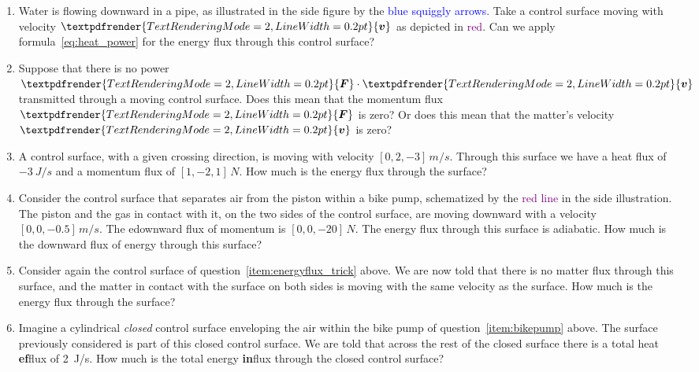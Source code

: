 \documentclass[a4paper,12pt,%
onecolumn,oneside,%
british%
]{memoir}
\renewcommand*{\bm}[1]{\textpdfrender{TextRenderingMode=2,LineWidth=0.2pt}{\boldsymbol{#1}}}
\renewcommand*{\|}[1][]{\nonscript\:#1\vert\nonscript\:\mathopen{}}
\newcommand*{\yv}{\bm{v}}
\newcommand*{\yF}{\bm{F}}
\begin{document}
\begin{exercise}
  \begin{enumerate}[exerc]
  \item Water is flowing downward in a pipe, as illustrated in the side figure by the \textcolor{blue}{blue squiggly arrows}. Take a control surface moving with velocity $\yv$ as depicted in \textcolor{purple}{red}. Can we apply  formula~\eqref{eq:heat_power} for the energy flux through this control surface?

  \item Suppose that there is no power $\yF\cdot\yv$ transmitted through a moving control surface. Does this mean that the momentum flux $\yF$ is zero? Or does this mean that the matter's velocity $\yv$ is zero?

  \item\label{item:energyflux_trick} A control surface, with a given crossing direction, is moving with velocity $[0,2,-3]\,\unit{m/s}$. Through this surface we have a heat flux of $\qty{-3}{J/s}$ and a momentum flux of $[1,-2,1]\,\unit{N}$. How much is the energy flux through the surface?

  \item\label{item:bikepump} Consider the control surface that separates air from the piston within a bike pump, schematized by the \textcolor{purple}{red line} in the side illustration. The piston and the gas in contact with it, on the two sides of the control surface, are moving downward with a velocity $[0,0,-0.5]\,\unit{m/s}$. The edownward flux of momentum is $[0,0,-20]\,\unit{N}$. The energy flux through this surface is adiabatic. How much is the downward flux of energy through this surface?

  \item Consider again the control surface of question~\ref{item:energyflux_trick} above. We are now told that there is no matter flux through this surface, and the matter in contact with the surface on both sides is moving with the same velocity as the surface. How much is the energy flux through the surface?

  \item Imagine a cylindrical \emph{closed} control surface enveloping the air within the bike pump of question~\ref{item:bikepump} above. The surface previously considered is part of this closed control surface. We are told that across the rest of the closed surface there is a total heat \textbf{ef}flux of \qty{2}{J/s}. How much is the total energy \textbf{in}flux through the closed control surface?
  \end{enumerate}
\end{exercise}
\end{document}
